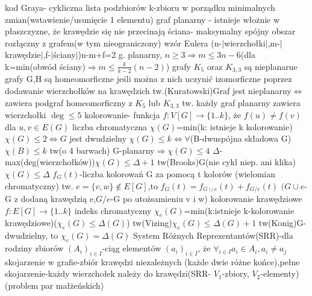\documentclass{article}
\begin{document}
{kod Graya- cykliczna lista podzbiorów k-zbioru w porządku minimalnych zmian(wstawienie/usunięcie 1 elementu)\newline
graf planarny - istnieje włożnie w płaszczyzne, że krawędzie się nie przecinają\newline
ściana- maksymalny spójny obszar rozłączny z grafem(w tym nieograniczony)\quad
wzór Eulera (n-$|$wierzchołki$|$,m-$|$krawędzie$|$,f-$|$ściany$|$)n-m+f=2\newline
g. planarny, $n\ge3\Rightarrow m\le3n-6$(dla k=min(obwód ściany)$\Rightarrow m\le\frac{k}{k-2}(n-2)$)\quad
grafy $K_{5}$ oraz $K_{3,3}$ są nieplanarne\newline
grafy G,H są homeomorficzne jeśli można z nich uczynić izomorficzne poprzez dodawanie wierzchołków na krawędzich\newline
tw.(Kuratowski)Graf jest nieplanarny$\Leftrightarrow$zawiera podgraf homeomorficzny z $K_5$ lub $K_{3,3}$\quad
tw. każdy graf planarny zawiera wierzchołki $\deg\le5$\quad
kolorowanie- funkcja $f:V[G]\rightarrow\{1..k\}$, że $f(u)\neq f(v)$ dla ${u,v}\in E(G)$\quad
liczba chromatyczna $\chi(G)$=min(k: istnieje k kolorowanie)\newline
$\chi(G)\le2\Leftrightarrow G$ jest dwudzielny\quad
$\chi(G)\le k\Leftrightarrow\forall$(B-dwuspójna składowa G)$\chi(B)\le k$\quad
tw(o 4 barwach) G-planarny$\Rightarrow\chi(G)\le 4$\newline
$\Delta$-max(deg(wierzchołków))$\chi(G)\le\Delta+1$\quad
tw(Brooks)G(nie cykl niep. ani klika)$\chi(G)\le\Delta$\newline
$f_G(t)$-liczba kolorowań G za pomocą t kolorów (wielomian chromatyczny)\newline
tw. $e=\{v,w\}\notin E[G]$,to $f_G(t)=f_{G\cup e}(t)+f_{G/e}(t)$ $(G\cup e$-G z dodaną krawędzią e,$G/e$-G po utożsamieniu v i w)\newline
kolorowanie krawędziowe $f:E[G]\rightarrow\{1..k\}$\quad
indeks chromatyczny $\chi_e(G)$=min(k:istnieje k-kolorowanie krawędziowe)($\chi_e(G)\le\Delta(G)$)\newline
tw(Vizing)$\chi_e(G)\le\Delta(G)+1$\quad
tw(K$\ddot{\text{o}}$nig)G-dwudzielny, to $\chi_e(G)=\Delta(G)$\newline
System Różnych Reprezentantów(SRR)-dla rodziny zbiorów $(A_i)_{i\in I}$-ciąg elementów $(a_i)_{i\in I}$, że $\forall_{i\in I}a_i\in A_i,a_i\neq a_j$\newline
skojarzenie w grafie-zbiór krawędzi niezależnych (każde dwie różne końce),pełne skojarzenie-każdy wierzchołek należy do krawędzi(SRR- $V_1$-zbiory, $V_2$-elementy)(problem par małżeńskich)\newline
}
\end{document}
